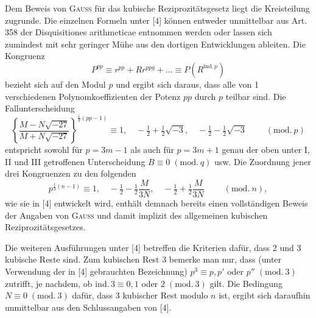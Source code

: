 Dem Beweis von \textsc{Gauss} für das kubische Reziprozitätsgesetz liegt die Kreisteilung zugrunde. Die
einzelnen Formeln unter [4] können entweder unmittelbar aus Art. 358 der Disquisitiones arithmeticae entnommen werden oder lassen sich zumindest mit sehr geringer Mühe aus den dortigen Entwicklungen ableiten.
Die Kongruenz
\[
P^{pp}\equiv r^{pp}+Rr^{ppg}+\ldots\equiv P(R^{\mathrm{ind.}\,p})
\]
bezieht sich auf den Modul $p$ und ergibt sich daraus, dass alle von 1 verschiedenen Polynomkoeffizienten der Potenz $pp$ durch $p$ teilbar sind. Die Fallunterscheidung
\[
\left\{\dfrac{M-N\sqrt{-27}}{M+N\sqrt{-27}}\right\}^{\frac13(pp-1)}\equiv 1,\quad -\tfrac12+\tfrac12\sqrt{-3},\quad -\tfrac12-\tfrac12\sqrt{-3}\qquad\;(\mathrm{mod.}\ p)
\]
entspricht sowohl für $p=3m-1$ als auch für $p=3m+1$ genau der oben unter I, II und III getroffenen
Unterscheidung $B\equiv 0\;(\mathrm{mod.}\ q)$ usw. Die Zuordnung jener drei Kongruenzen zu den folgenden
\[
p^{\frac13(n-1)}\equiv 1,\quad -\tfrac12-\tfrac12\dfrac{M}{3N},\quad -\tfrac12+\tfrac12\dfrac{M}{3N}\qquad\;(\mathrm{mod.}\ n),
\]
wie sie in [4] entwickelt wird, enthält demnach bereits einen vollständigen Beweis der Angaben von \textsc{Gauss}
und damit implizit des allgemeinen kubischen Reziprozitätsgesetzes.

Die weiteren Ausführungen unter [4] betreffen die Kriterien dafür, dass 2 und 3 kubische Reste sind.
Zum kubischen Rest 3 bemerke man nur, dass (unter Verwendung der in [4] gebrauchten Bezeichnung)
$p^3\equiv p, p'$ oder $p''\;(\mathrm{mod.}\ 3)$ zutrifft, je nachdem, ob ind.\,$3\equiv 0, 1$ oder $2\;(\mathrm{mod.}\ 3)$ gilt. Die Bedingung
$N\equiv 0\;(\mathrm{mod.}\ 3)$ dafür, dass 3 kubischer Rest modulo $n$ ist, ergibt sich daraufhin unmittelbar aus den Schlussangaben von [4].

